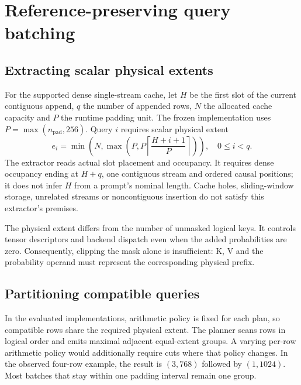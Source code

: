 \section{Reference-preserving query batching}
\label{sec:method}
\subsection{Extracting scalar physical extents}
For the supported dense single-stream cache, let $H$ be the first slot of the current contiguous append, $q$ the number of appended rows, $N$ the allocated cache capacity and $P$ the runtime padding unit. The frozen implementation uses $P=\max(n_{\mathrm{pad}},256)$. Query $i$ requires scalar physical extent
\begin{equation}
e_i=\min\!\left(N,\max\!\left(P,P\left\lceil
\frac{H+i+1}{P}\right\rceil\right)\right),\quad 0\leq i<q.
\label{eq:extent}
\end{equation}
The extractor reads actual slot placement and occupancy. It requires dense occupancy ending at $H+q$, one contiguous stream and ordered causal positions; it does not infer $H$ from a prompt's nominal length. Cache holes, sliding-window storage, unrelated streams or noncontiguous insertion do not satisfy this extractor's premises.

The physical extent differs from the number of unmasked logical keys. It controls tensor descriptors and backend dispatch even when the added probabilities are zero. Consequently, clipping the mask alone is insufficient: K, V and the probability operand must represent the corresponding physical prefix.

\subsection{Partitioning compatible queries}
In the evaluated implementations, arithmetic policy is fixed for each plan, so compatible rows share the required physical extent. The planner scans rows in logical order and emits maximal adjacent equal-extent groups. A varying per-row arithmetic policy would additionally require cuts where that policy changes. In the observed four-row example, the result is $(3,768)$ followed by $(1,1024)$. Most batches that stay within one padding interval remain one group.

